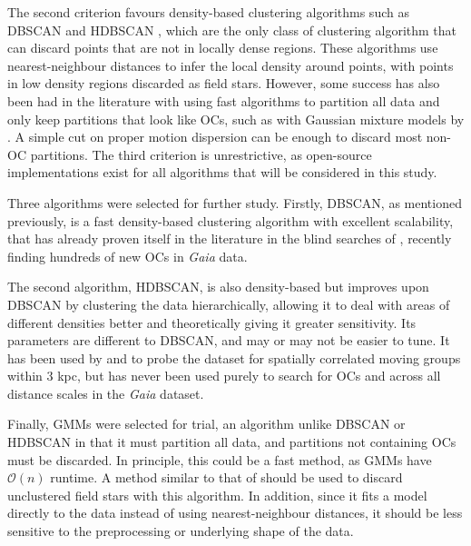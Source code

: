 The second criterion favours density-based clustering algorithms such as DBSCAN \citep[Density-Based Spatial Clustering of Applications with Noise,][]{ester_density-based_1996} and HDBSCAN \citep[Hierarchical DBSCAN,][]{hutchison_hdbscan_2013}, which are the  only class of clustering algorithm that can discard points that are not in locally dense regions. These algorithms use nearest-neighbour distances to infer the local density around points, with points in low density regions discarded as field stars. However, some success has also been had in the literature with using fast algorithms to partition all data and only keep partitions that look like OCs, such as with Gaussian mixture models \citep[hereafter GMMs]{dempster_maximum_1977} by \cite{cantat-gaudin_gaia_2019}. A simple cut on proper motion dispersion can be enough to discard most non-OC partitions. The third criterion is unrestrictive, as open-source implementations exist for all algorithms that will be considered in this study.

Three algorithms were selected for further study. Firstly, DBSCAN, as mentioned previously, is a fast density-based clustering algorithm with excellent scalability, that has already proven itself in the literature in the blind searches of \cite{castro-ginard_new_2018, castro-ginard_hunting_2019, castro-ginard_hunting_2020}, recently finding hundreds of new OCs in \emph{Gaia} data. 

The second algorithm, HDBSCAN, is also density-based but improves upon DBSCAN by clustering the data hierarchically, allowing it to deal with areas of different densities better and theoretically giving it greater sensitivity. Its parameters are different to DBSCAN, and may or may not be easier to tune. It has been used by \cite{kounkel_untangling_2019} and \cite{kounkel_untangling_2020} to probe the \emph{} dataset for spatially correlated moving groups within 3 kpc, but has never been used purely to search for OCs and across all distance scales in the \emph{Gaia} dataset.

Finally, GMMs were selected for trial, an algorithm unlike DBSCAN or HDBSCAN in that it must partition all data, and partitions not containing OCs must be discarded. In principle, this could be a fast method, as GMMs have $\mathcal{O} ( n )$ runtime. A method similar to that of \cite{cantat-gaudin_gaia_2019} should be used to discard unclustered field stars with this algorithm. In addition, since it fits a model directly to the data instead of using nearest-neighbour distances, it should be less sensitive to the preprocessing or underlying shape of the data.

